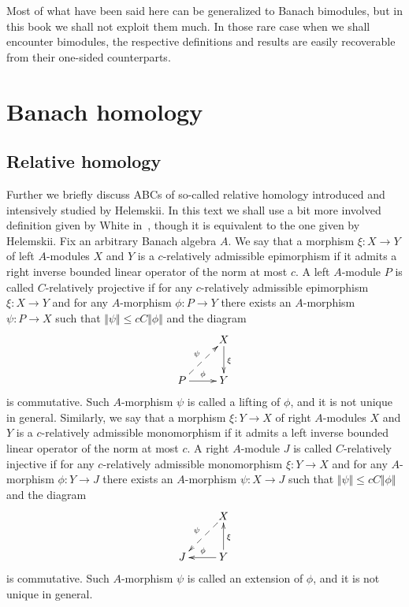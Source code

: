 Most of what have been said here can be generalized to Banach bimodules, but in
this book we shall not exploit them much. In those rare case when we shall
encounter bimodules, the respective definitions and results are easily
recoverable from their one-sided counterparts.


\section{
  Banach homology}\label{SectionBanachHomology}


\subsection{
  Relative homology}\label{SubSectionRelativeHomology}

Further we briefly discuss ABCs of so-called relative homology introduced and intensively
studied by Helemskii. In this text we shall use a bit more involved
definition given by White in~\cite{WhiteInjmoduAlg}, though it is equivalent to the one
given by Helemskii. Fix an arbitrary Banach algebra $A$. We say that a
morphism $\xi:X\to Y$ of left $A$-modules $X$ and $Y$ is a $c$-relatively 
admissible epimorphism if it admits a right inverse bounded linear operator of 
the norm at most $c$. A left $A$-module $P$ is called $C$-relatively projective 
if for any $c$-relatively admissible epimorphism $\xi:X\to Y$ and 
for any  $A$-morphism $\phi:P\to Y$ there exists 
an $A$-morphism $\psi:P\to X$ such 
that $\Vert \psi\Vert\leq cC\Vert \phi\Vert$ and the diagram
$$
\xymatrix{
& {X} \ar[d]^{\xi}\\  %
{P} \ar@{-->}[ur]^{\psi} \ar[r]^{\phi} &{Y}}  %
$$
is commutative. Such $A$-morphism $\psi$ is called a lifting of $\phi$, and it is
not unique in general. Similarly,  we say that a morphism $\xi:Y\to X$ of right
$A$-modules $X$ and $Y$ is a $c$-relatively admissible monomorphism if it admits
a left inverse bounded linear operator of the norm at most $c$. A right 
$A$-module $J$ is called $C$-relatively injective if for any $c$-relatively 
admissible monomorphism $\xi:Y\to X$ and for 
any $A$-morphism $\phi:Y\to J$ there exists an $A$-morphism $\psi:X\to J$ such 
that $\Vert\psi\Vert\leq cC\Vert\phi\Vert$ and the diagram
$$
\xymatrix{
& {X} \ar@{-->}[dl]_{\psi} \\  %
{J} &{Y} \ar[l]_{\phi} \ar[u]_{\xi}}  %
$$
is commutative. Such $A$-morphism $\psi$ is called an extension of $\phi$, and it
is not unique in general.

